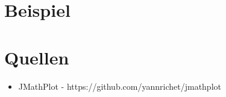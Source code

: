 \documentclass[11pt, bibliography=totocnumbered]{scrartcl}
\begin{document}
\section{Beispiel}

\section{Quellen}
\begin{itemize}
\item JMathPlot - https://github.com/yannrichet/jmathplot
\end{itemize}
\end{document}
